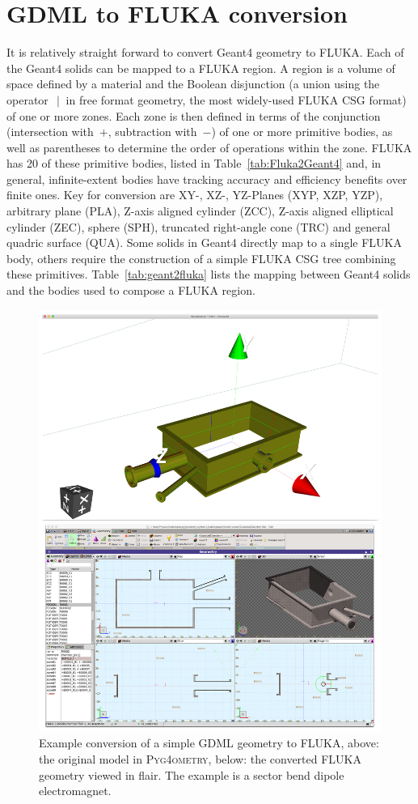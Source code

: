 \documentclass[preprint,12pt]{elsarticle}
\newcommand{\PYGEOMETRY}{\textsc{Pyg4ometry}}
\begin{document}
\section{GDML to FLUKA conversion}
It is relatively straight forward to convert Geant4 geometry to FLUKA. Each
of the Geant4 solids can be mapped to a FLUKA region.  A region is a volume
of space defined by a material and the Boolean disjunction (a union using
the operator~$\:|\:$ in free format geometry, the most widely-used FLUKA
CSG format) of one or more zones. Each zone is then defined in terms
of the conjunction (intersection with~$+$, subtraction with~$-$) of one or
more primitive bodies, as well as parentheses to determine the order of
operations within the zone.  FLUKA has 20 of these primitive bodies, listed
in Table~\ref{tab:Fluka2Geant4} and, in general, infinite-extent bodies
have tracking accuracy and efficiency benefits over finite ones. Key for
conversion are XY-, XZ-, YZ-Planes (XYP, XZP, YZP), arbitrary plane (PLA),
Z-axis aligned cylinder (ZCC), Z-axis aligned elliptical cylinder (ZEC),
sphere (SPH), truncated right-angle cone (TRC) and general quadric surface
(QUA). Some solids in Geant4 directly map to a single FLUKA body, others
require the construction of a simple FLUKA CSG tree combining these
primitives. Table~\ref{tab:geant2fluka} lists the mapping between Geant4
solids and the bodies used to compose a FLUKA region.
\begin{figure}
\begin{center}
\includegraphics[width=0.9\columnwidth]{CuboidalChamber}
\caption{Example conversion of a simple GDML geometry to FLUKA, above:
the original model in \PYGEOMETRY{}, below: the converted FLUKA geometry
viewed in flair. The example is a sector bend dipole electromagnet.}
\label{fig:gdml-flair}
\end{center}
\end{figure}
\end{document}
